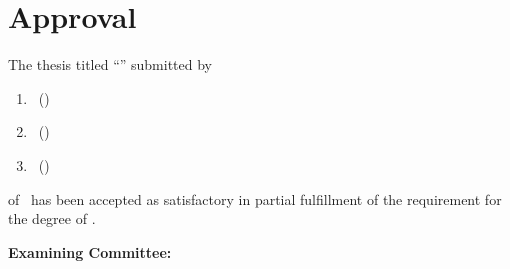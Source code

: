 \chapter*{Approval}
The thesis titled ``\thesistitle'' submitted by
\begin{enumerate}
  \item \studentA\ (\idA)
  \item \studentB\ (\idB)
  \item \studentC\ (\idC)
\end{enumerate}
of \semester\ has been accepted as satisfactory in partial fulfillment of the requirement for the degree of \degree.

\vspace{0.4cm}
\noindent\textbf{Examining Committee:}
\vspace{0.4cm}

